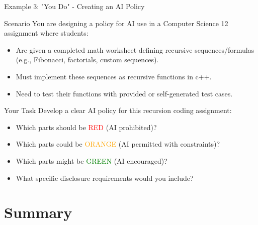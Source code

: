\documentclass{beamer}
\begin{document}
\begin{frame}{Example 3: "You Do" - Creating an AI Policy}
\begin{block}{Scenario}
You are designing a policy for AI use in a Computer Science 12 assignment where students:
\begin{itemize}
    \item Are given a completed math worksheet defining recursive sequences/formulas (e.g., Fibonacci, factorials, custom sequences).
    \item Must implement these sequences as recursive functions in c++.
    \item Need to test their functions with provided or self-generated test cases.
    
\end{itemize}
\end{block}

\begin{block}{Your Task}
Develop a clear AI policy for this recursion coding assignment:
\begin{itemize}
    \item Which parts should be
    \textcolor{red}{RED} (AI prohibited)? \\ 
    \item Which parts could be
    \textcolor{orange}{ORANGE} (AI permitted with constraints)? \\ 
    \item Which parts might be
    \textcolor{green}{GREEN} (AI encouraged)? \\ 
    \item What specific disclosure requirements would you include?
\end{itemize}
\end{block}

\end{frame}

\section{Summary}
\end{document}

